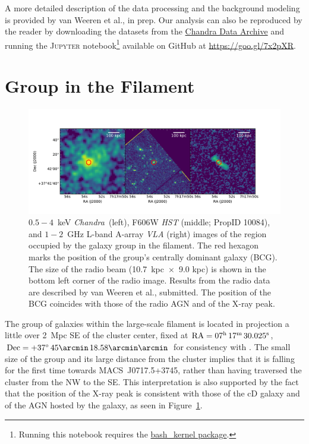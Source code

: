 \documentclass[11pt,a4paper,useAMS,iop]{emulateapj}
\newcommand{\chandra}{\emph{Chandra}}
\begin{document}
A more detailed description of the data processing and the background modeling is provided by van Weeren et al., in prep. Our analysis can also be reproduced by the reader by downloading the datasets from the \href{http://cda.harvard.edu/chaser/}{Chandra Data Archive} and running the \textsc{Jupyter} notebook\footnote{Running this notebook requires the \href{https://github.com/takluyver/bash\_kernel}{bash\_kernel package}.} available on GitHub at \url{https://goo.gl/7x2pXR}. 

\section{Group in the Filament}
\label{sec:Group}

\begin{figure}
	\includegraphics[width=\textwidth]{plots/group_bcg.pdf}
	\caption{$0.5-4$~keV  \chandra\ (left), F606W \emph{HST} (middle; PropID 10084), and $1-2$~GHz L-band A-array \emph{VLA} (right) images of the region occupied by the galaxy group in the filament. The red hexagon marks the position of the group's centrally dominant galaxy (BCG). The size of the radio beam (10.7~kpc~$\times$~9.0 kpc) is shown in the bottom left corner of the radio image. Results from the radio data are described by van Weeren et al., submitted. The position of the BCG coincides with those of the radio AGN and of the X-ray peak.\label{fig:group}}
\end{figure}

The group of galaxies within the large-scale filament is located in projection a little over 2~Mpc SE of the cluster center, fixed at ${\rm RA} = 07^{\rm h}\, 17^{\rm m}\, 30.025^{\rm s}$, ${\rm Dec} = +37^{\circ}\, 45\arcmin \, 18.58\arcmin\arcmin$ for consistency with \citet{Jauzac2012}. The small size of the group and its large distance from the cluster implies that it is falling for the first time towards MACS~J0717.5+3745, rather than having traversed the cluster from the NW to the SE. This interpretation is also supported by the fact that the position of the X-ray peak is consistent with those of the cD galaxy and of the AGN hosted by the galaxy, as seen in Figure~\ref{fig:group}.
\end{document}
